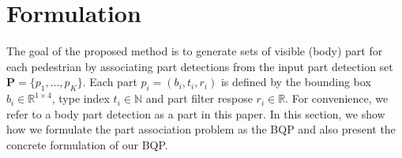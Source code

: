 \documentclass[10pt,twocolumn,letterpaper]{article}
\begin{document}
\section{Formulation}
\label{sec:formulation}
The goal of the proposed method is to generate sets of visible (body) part for each pedestrian by associating part detections from the input part detection set $\mathbf{P}=\{p_1,...,p_K\}$.
Each part $p_i = (b_i, t_i, r_i)$ is defined by the bounding box $b_i \in \mathbb{R}^{1\times4}$, type index $t_i \in \mathbb{N}$ and part filter respose $r_i \in \mathbb{R}$. For convenience, we refer to a body part detection as a part in this paper.
In this section, we show how we formulate the part association problem as the BQP and also present the concrete formulation of our BQP.

\end{document}
